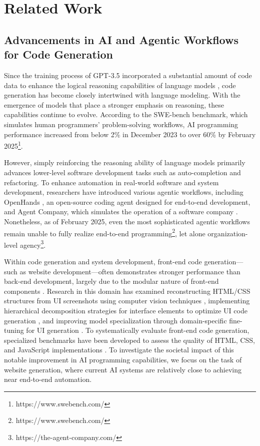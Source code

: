 \section{Related Work}

\subsection{Advancements in AI and Agentic Workflows for Code Generation}

Since the training process of GPT-3.5 incorporated a substantial amount of code data to enhance the logical reasoning capabilities of language models \cite{chenEvaluatingLargeLanguage2021}, code generation has become closely intertwined with language modeling. With the emergence of models that place a stronger emphasis on reasoning, these capabilities continue to evolve. According to the SWE-bench benchmark, which simulates human programmers' problem-solving workflows, AI programming performance increased from below 2\% in December 2023 \cite{jimenez2024swebench} to over 60\% by February 2025\footnote{https://www.swebench.com/}.

However, simply reinforcing the reasoning ability of language models primarily advances lower-level software development tasks such as auto-completion and refactoring. To enhance automation in real-world software and system development, researchers have introduced various agentic workflows, including OpenHands \cite{openhands}, an open-source coding agent designed for end-to-end development, and Agent Company, which simulates the operation of a software company \cite{xu2024theagentcompany}. Nonetheless, as of February 2025, even the most sophisticated agentic workflows remain unable to fully realize end-to-end programming\footnote{https://www.swebench.com/}, let alone organization-level agency\footnote{https://the-agent-company.com/}. 

Within code generation and system development, front-end code generation—such as website development—often demonstrates stronger performance than back-end development, largely due to the modular nature of front-end components \cite{}. Research in this domain has examined reconstructing HTML/CSS structures from UI screenshots using computer vision techniques \cite{soseliaLearningUItoCodeReverse2023}, implementing hierarchical decomposition strategies for interface elements to optimize UI code generation \cite{wanAutomaticallyGeneratingUI2024}, and improving model specialization through domain-specific fine-tuning for UI generation \cite{wuUICoderFinetuningLarge2024}. To systematically evaluate front-end code generation, specialized benchmarks have been developed to assess the quality of HTML, CSS, and JavaScript implementations \cite{siDesign2CodeHowFar2024}. To investigate the societal impact of this notable improvement in AI programming capabilities, we focus on the task of website generation, where current AI systems are relatively close to achieving near end-to-end automation.

